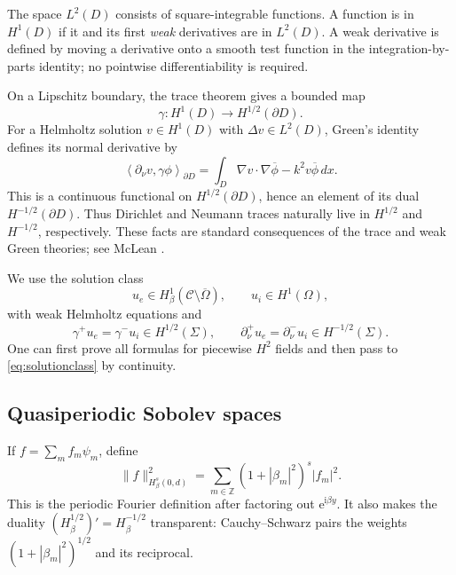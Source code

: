 \documentclass[11pt]{article}
\newcommand{\C}{\mathcal C}
\newcommand{\Om}{\Omega}
\newcommand{\Sig}{\Sigma}
\newcommand{\Z}{\mathbb Z}
\newcommand{\ii}{\mathrm i}
\newcommand{\ee}{\mathrm e}
\newcommand{\pair}[2]{\left\langle #1,#2\right\rangle}
\theoremstyle{plain}
\theoremstyle{definition}
\theoremstyle{remark}
\begin{document}
The space \(L^2(D)\) consists of square-integrable functions.  A function is in
\(H^1(D)\) if it and its first \emph{weak} derivatives are in \(L^2(D)\).  A
weak derivative is defined by moving a derivative onto a smooth test function
in the integration-by-parts identity; no pointwise differentiability is
required.

On a Lipschitz boundary, the trace theorem gives a bounded map
\[
\gamma:H^1(D)\longrightarrow H^{1/2}(\partial D).
\]
For a Helmholtz solution \(v\in H^1(D)\) with \(\Delta v\in L^2(D)\), Green's
identity defines its normal derivative by
\begin{equation}
\pair{\partial_\nu v}{\gamma\phi}_{\partial D}
=\int_D \nabla v\cdot\nabla\overline\phi-k^2v\overline\phi\,dx.
\label{eq:weaknormal}
\end{equation}
This is a continuous functional on \(H^{1/2}(\partial D)\), hence an element of
its dual \(H^{-1/2}(\partial D)\).  Thus Dirichlet and Neumann traces naturally
live in \(H^{1/2}\) and \(H^{-1/2}\), respectively.  These facts are standard
consequences of the trace and weak Green theories; see McLean
\cite[Chapters 3--4]{McLean2000}.

We use the solution class
\begin{equation}
u_e\in H^1_\beta(\C\setminus\overline\Om),\qquad
u_i\in H^1(\Om),
\label{eq:solutionclass}
\end{equation}
with weak Helmholtz equations and
\begin{equation}
\gamma^+u_e=\gamma^-u_i\in H^{1/2}(\Sig),\qquad
\partial_\nu^+u_e=\partial_\nu^-u_i\in H^{-1/2}(\Sig).
\label{eq:transmission}
\end{equation}
One can first prove all formulas for piecewise \(H^2\) fields and then pass to
\eqref{eq:solutionclass} by continuity.

\subsection{Quasiperiodic Sobolev spaces}

If \(f=\sum_m f_m\psi_m\), define
\begin{equation}
\|f\|_{H^s_\beta(0,d)}^2
=\sum_{m\in\Z}(1+|\beta_m|^2)^s|f_m|^2.
\label{eq:Hs}
\end{equation}
This is the periodic Fourier definition after factoring out
\(\ee^{\ii\beta y}\).  It also makes the duality
\((H^{1/2}_\beta)'=H^{-1/2}_\beta\) transparent: Cauchy--Schwarz pairs the
weights \((1+|\beta_m|^2)^{1/2}\) and its reciprocal.
\end{document}

